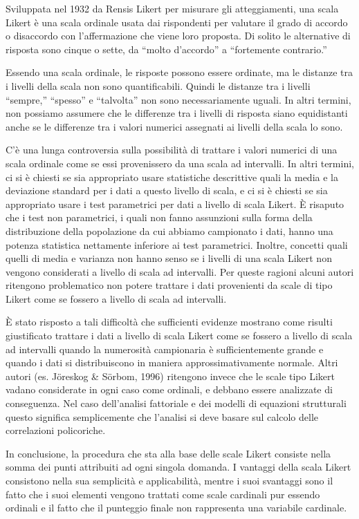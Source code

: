 \documentclass[
  11pt,
]{krantz}
\theoremstyle{definition}
\theoremstyle{definition}
\theoremstyle{definition}
\theoremstyle{definition}
\theoremstyle{remark}
\begin{document}
Sviluppata nel 1932 da Rensis Likert per misurare gli atteggiamenti, una scala Likert è una scala ordinale usata dai rispondenti per valutare il grado di accordo o disaccordo con l'affermazione che viene loro proposta. Di solito le alternative di risposta sono cinque o sette, da ``molto d'accordo'' a ``fortemente contrario.''

Essendo una scala ordinale, le risposte possono essere ordinate, ma le distanze tra i livelli della scala non sono quantificabili. Quindi le distanze tra i livelli ``sempre,'' ``spesso'' e ``talvolta'' non sono necessariamente uguali. In altri termini, non possiamo assumere che le differenze tra i livelli di risposta siano equidistanti anche se le differenze tra i valori numerici assegnati ai livelli della scala lo sono.

C'è una lunga controversia sulla possibilità di trattare i valori numerici di una scala ordinale come se essi provenissero da una scala ad intervalli. In altri termini, ci si è chiesti se sia appropriato usare statistiche descrittive quali la media e la deviazione standard per i dati a questo livello di scala, e ci si è chiesti se sia appropriato usare i test parametrici per dati a livello di scala Likert. È risaputo che i test non parametrici, i quali non fanno assunzioni sulla forma della distribuzione della popolazione da cui abbiamo campionato i dati, hanno una potenza statistica nettamente inferiore ai test parametrici. Inoltre, concetti quali quelli di media e varianza non hanno senso se i livelli di una scala Likert non vengono considerati a livello di scala ad intervalli. Per queste ragioni alcuni autori ritengono problematico non potere trattare i dati provenienti da scale di tipo Likert come se fossero a livello di scala ad intervalli.

È stato risposto a tali difficoltà che sufficienti evidenze mostrano come risulti giustificato trattare i dati a livello di scala Likert come se fossero a livello di scala ad intervalli quando la numerosità campionaria è sufficientemente grande e quando i dati si distribuiscono in maniera approssimativamente normale. Altri autori (es. Jöreskog \& Sörbom, 1996) ritengono invece che le scale tipo Likert vadano considerate in ogni caso come ordinali, e debbano essere analizzate di conseguenza. Nel caso dell'analisi fattoriale e dei modelli di equazioni strutturali questo significa semplicemente che l'analisi si deve basare sul calcolo delle correlazioni policoriche.

In conclusione, la procedura che sta alla base delle scale Likert consiste nella somma dei punti attribuiti ad ogni singola domanda. I vantaggi della scala Likert consistono nella sua semplicità e applicabilità, mentre i suoi svantaggi sono il fatto che i suoi elementi vengono trattati come scale cardinali pur essendo ordinali e il fatto che il punteggio finale non rappresenta una variabile cardinale.
\end{document}
